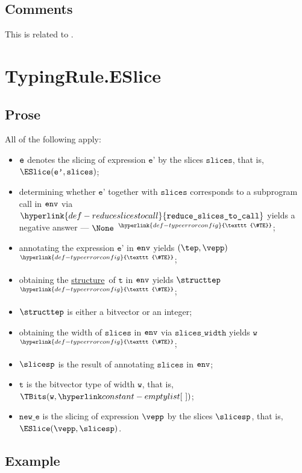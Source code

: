 \documentclass{book}
\newcommand\TypeErrorConfig[0]{\hyperlink{def-typeerrorconfig}{\texttt{\#TE}}}
\newcommand\ProseOrTypeError[0]{\hyperlink{def-proseortypeerror}{$^{\TypeErrorConfig}$}}
\newcommand\structure[0]{\hyperlink{def-structure}{structure}}
\newcommand\sliceswidth[0]{\texttt{slices\_width}}
\newcommand\reduceslicestocall[0]{\hyperlink{def-reduceslicestocall}{\texttt{reduce\_slices\_to\_call}}}
\newcommand\vt[0]{\texttt{t}}
\newcommand\vw[0]{\texttt{w}}
\newcommand\slices[0]{\texttt{slices}}
\newcommand\newe[0]{\texttt{new\_e}}
\newcommand\vep[0]{\texttt{e'}}
\begin{document}
\subsection{Comments}
  This is related to .

\section{TypingRule.ESlice \label{sec:TypingRule.ESlice}}

\subsection{Prose}
All of the following apply:
\begin{itemize}
  \item $\texttt{e}$ denotes the slicing of expression $\vep$ by the slices $\slices$, that is, \\
  $\ESlice(\vep, \slices)$;
  \item determining whether $\vep$ together with $\slices$ corresponds to a subprogram call
  in $\texttt{env}$ via $\reduceslicestocall$ yields a negative answer --- $\None$ \ProseOrTypeError;
  \item annotating the expression $\vep$ in $\texttt{env}$ yields $(\tep,\vepp)$ \ProseOrTypeError;
  \item obtaining the \structure\ of $\vt$ in $\texttt{env}$ yields $\structtep$ \ProseOrTypeError;
  \item $\structtep$ is either a bitvector or an integer;
  \item obtaining the width of $\slices$ in $\texttt{env}$ via $\sliceswidth$ yields $\vw$ \ProseOrTypeError;
  \item $\slicesp$ is the result of annotating $\slices$ in $\texttt{env}$;
  \item $\vt$ is the bitvector type of width $\vw$, that is, $\TBits(\vw, \emptylist)$;
  \item $\newe$ is the slicing of expression $\vepp$ by the slices $\slicesp$, that is, \\
  $\ESlice(\vepp, \slicesp)$.
\end{itemize}

\subsection{Example}

\end{document}
